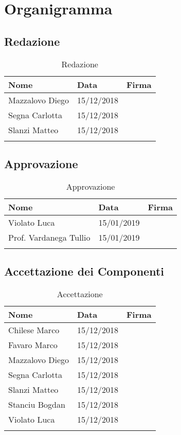 \section{Organigramma}


\subsection{Redazione}

\begin{longtable}{|C{.25\textwidth}|C{.16\textwidth}|C{.45\textwidth}|}
\hline
\textbf{Nome} & \textbf{Data} & \textbf{Firma}\\
\hline \hline
\endfirsthead
Mazzalovo Diego & 15/12/2018 &  \\
\hline
Segna Carlotta & 15/12/2018 & \\
\hline
Slanzi Matteo & 15/12/2018 & \\
\hline
\caption{Redazione}
\label{Tabella Redazione}
\end{longtable}


\subsection{Approvazione}

\begin{longtable}{|C{.25\textwidth}|C{.16\textwidth}|C{.45\textwidth}|}
\hline
\textbf{Nome} & \textbf{Data} & \textbf{Firma}\\
\hline \hline
\endfirsthead
Violato Luca & 15/01/2019 &  \\
\hline
Prof. Vardanega Tullio & 15/01/2019 & \\
\hline
\caption{Approvazione}
\label{Tabella Approvazione}
\end{longtable}

\subsection{Accettazione dei Componenti}

\begin{longtable}{|C{.25\textwidth}|C{.16\textwidth}|C{.45\textwidth}|}
\hline
\textbf{Nome} & \textbf{Data} & \textbf{Firma}\\
\hline \hline
\endfirsthead
Chilese Marco & 15/12/2018 &  \\
\hline
Favaro Marco & 15/12/2018 &  \\
\hline
Mazzalovo Diego & 15/12/2018 &  \\
\hline
Segna Carlotta & 15/12/2018 &  \\
\hline
Slanzi Matteo & 15/12/2018 &  \\
\hline
Stanciu Bogdan & 15/12/2018 &  \\
\hline
Violato Luca & 15/12/2018 & \\
\hline
\caption{Accettazione}
\label{Tabella Accettazione}
\end{longtable}

